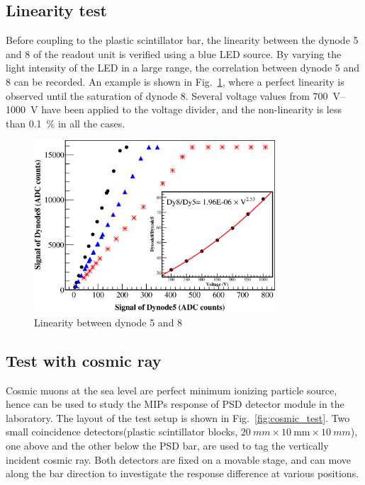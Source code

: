 \documentclass[5p, times]{elsarticle}
\begin{document}
\subsection{Linearity test}
\label{sec:led}

Before coupling to the plastic scintillator bar, the linearity between the dynode 5 and 8 of the readout unit is verified using a blue LED source.
By varying the light intensity of the LED in a large range, the correlation between dynode 5 and 8 can be recorded.
An example is shown in Fig.~\ref{fig:linearity}, where a perfect linearity is observed until the saturation of dynode 8.
Several voltage values from \SIrange{700}{1000}{\volt} have been applied to the voltage divider, and the non-linearity is less than \SI{0.1}{\percent} in all the cases.

\begin{figure}
\centering
\includegraphics[width=90mm]{linearity}
\caption{Linearity between dynode 5 and 8}
\label{fig:linearity}
\end{figure}


\subsection{Test with cosmic ray}
\label{sec:cosmicray}
Cosmic muons at the sea level are perfect minimum ionizing particle source, hence can be used to study the MIPs response of PSD detector module in the laboratory.
The layout of the test setup is shown in Fig.~\ref{fig:cosmic_test}.
Two small coincidence detectors(plastic scintillator blocks, $\SI{20}{mm} \times \SI{10}{\milli\meter} \times \SI{10}{mm}$), one above and the other below the PSD bar, are used to tag the vertically incident cosmic ray.
Both detectors are fixed on a movable stage, and can move along the bar direction to investigate the response difference at various positions. 
\end{document}

